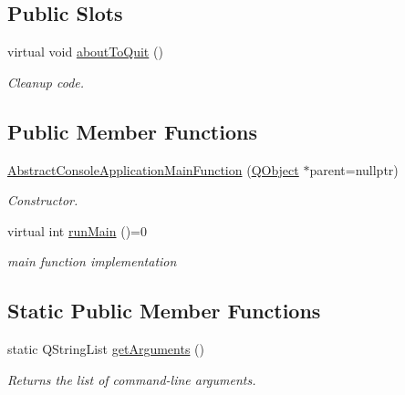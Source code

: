 \subsection*{Public Slots}
\begin{DoxyCompactItemize}
\item 
virtual void \hyperlink{class_mdt_1_1_abstract_console_application_main_function_a7f00b12d06e341d037cd1a69632b2ac2}{about\+To\+Quit} ()
\begin{DoxyCompactList}\small\item\em Cleanup code. \end{DoxyCompactList}\end{DoxyCompactItemize}
\subsection*{Public Member Functions}
\begin{DoxyCompactItemize}
\item 
\hyperlink{class_mdt_1_1_abstract_console_application_main_function_aec80aaecedd4a2d6696878b96cfc9b40}{Abstract\+Console\+Application\+Main\+Function} (\hyperlink{class_q_object}{Q\+Object} $\ast$parent=nullptr)
\begin{DoxyCompactList}\small\item\em Constructor. \end{DoxyCompactList}\item 
virtual int \hyperlink{class_mdt_1_1_abstract_console_application_main_function_a34213b6ac2188b3620f5c2f5ce4ee287}{run\+Main} ()=0
\begin{DoxyCompactList}\small\item\em main function implementation \end{DoxyCompactList}\end{DoxyCompactItemize}
\subsection*{Static Public Member Functions}
\begin{DoxyCompactItemize}
\item 
static Q\+String\+List \hyperlink{class_mdt_1_1_abstract_console_application_main_function_a4bfe1909139f3c30b03797f7778290fb}{get\+Arguments} ()
\begin{DoxyCompactList}\small\item\em Returns the list of command-\/line arguments. \end{DoxyCompactList}\end{DoxyCompactItemize}


